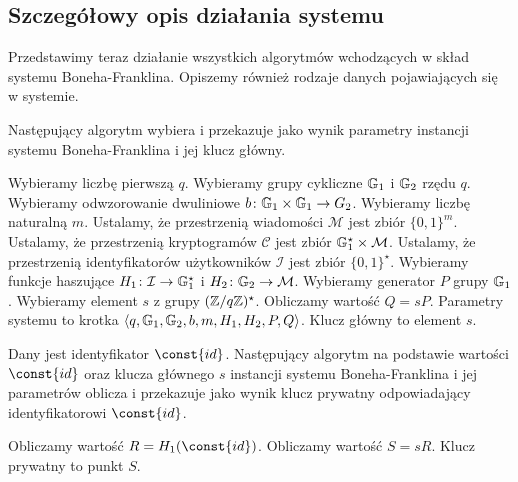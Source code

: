 \subsection*{Szczegółowy opis działania systemu}

\noindent
Przedstawimy teraz działanie wszystkich algorytmów
wchodzących w skład systemu Boneha-Franklina.
Opiszemy również rodzaje danych pojawiających się w systemie.

\begin{algorithm}
Następujący algorytm wybiera i przekazuje jako wynik
parametry instancji systemu Boneha-Franklina
i jej klucz główny.

\begin{codebox}
\li
Wybieramy liczbę pierwszą $q$.
\li
Wybieramy grupy cykliczne $\mathbb{G}_1$ i $\mathbb{G}_2$ rzędu $q$.
\li
Wybieramy odwzorowanie dwuliniowe $b\colon \mathbb{G}_1 \times \mathbb{G}_1 \to G_2$.
\li
Wybieramy liczbę naturalną $m$.
\li
Ustalamy, że przestrzenią wiadomości $\mathcal{M}$
jest zbiór $\{0, 1\}^m$.
\li
Ustalamy, że przestrzenią kryptogramów $\mathcal{C}$
jest zbiór $\mathbb{G}_1^\star \times \mathcal{M}$.
\li
Ustalamy, że przestrzenią identyfikatorów użytkowników $\mathcal{I}$
jest zbiór $\{0, 1\}^\star$.
\li
Wybieramy funkcje haszujące
$H_1\colon \mathcal{I} \to \mathbb{G}_1^\star$
i $H_2\colon \mathbb{G}_2 \to \mathcal{M}$.
\li
Wybieramy generator $P$ grupy $\mathbb{G}_1$.
\li
Wybieramy element $s$ z grupy $(\mathbb{Z} / q\mathbb{Z})^\star$.
\li
Obliczamy wartość $Q = sP$.
\li
Parametry systemu to krotka
$\left\langle q, \mathbb{G}_1, \mathbb{G}_2, b, m, H_1, H_2, P, Q \right\rangle$.
\li
Klucz główny to element $s$.
\end{codebox}
\end{algorithm}

\begin{algorithm}
Dany jest identyfikator $\const{id}$.
Następujący algorytm na podstawie wartości $\const{id}$
oraz klucza głównego $s$ instancji systemu Boneha-Franklina i jej parametrów
oblicza i przekazuje jako wynik
klucz prywatny odpowiadający identyfikatorowi $\const{id}$.

\begin{codebox}
\li
Obliczamy wartość $R = H_1(\const{id})$.
\li
Obliczamy wartość $S = sR$.
\li
Klucz prywatny to punkt $S$.
\end{codebox}
\end{algorithm}

